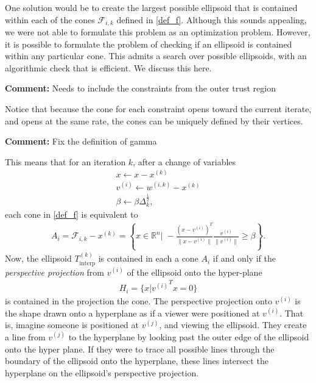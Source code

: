\documentclass{article}
\newenvironment{comment}
  {\par\medskip
   \color{red}%
   \begin{framed}
   \textbf{Comment: }\ignorespaces}
 {\end{framed}
  \medskip}
\theoremstyle{case}
\newcommand{\xk}{{x^{(k)}}}
\newcommand{\Rn}{\mathbb R^n}
\newcommand{\dk}{\Delta_k}
\newcommand{\sampletrk}{{T_{\text{interp}}^{(k)}}}
\newcommand{\fik}{{\mathcal F_{i, k}}}
\newcommand{\wik}{{w^{(i, k)}}}
\begin{document}
One solution would be to create the largest possible ellipsoid that is contained within each of the cones $\fik$ defined in \cref{def_f}.
Although this sounds appealing, we were not able to formulate this problem as an optimization problem.
However, it is possible to formulate the problem of checking if an ellipsoid is contained within any particular cone.
This admits a search over possible ellipsoids, with an algorithmic check that is efficient.
We discuss this here.

\begin{comment}
Needs to include the constraints from the outer trust region
\end{comment}

Notice that because the cone for each constraint opens toward the current iterate, and opens at the same rate, the cones can be uniquely defined by their vertices.

\begin{comment}
Fix the definition of gamma
\end{comment}
This means that for an iteration $k$, after a change of variables
\begin{align}
x \gets x - \xk \\
v^{(i)}  \gets \wik - \xk \\
\beta \gets \beta \dk^{\frac 1 2},
\end{align}
each cone in \cref{def_f} is equivalent to
\begin{align*}
A_i = \fik - \xk = \left\{x\in\Rn\bigg|\;-\frac{(x - v^{(i)})^T}{\|x - v^{(i)}\|} \frac{v^{(i)}}{\|v^{(i)}\|} \ge \beta \right\}.
\end{align*}
Now, the ellipsoid $\sampletrk$ is contained in each a cone $A_i$ if and only if the \emph{perspective projection} from $v^{(i)}$ of the ellipsoid onto the hyper-plane 
\begin{align*}
H_i = \{x|{v^{(i)}}^Tx = 0\}
\end{align*}
is contained in the projection the cone.
The perspective projection onto $v^{(i)}$ is the shape drawn onto a hyperplane as if a viewer were positioned at $v^{(i)}$.
That is, imagine someone is positioned at $v^{(j)}$, and viewing the ellipsoid.
They create a line from $v^{(j)}$ to the hyperplane by looking past the outer edge of the ellipsoid onto the hyper plane.
If they were to trace all possible lines through the boundary of the ellipsoid onto the hyperplane, these lines intersect the hyperplane on the ellipsoid's perspective projection.
\end{document}
